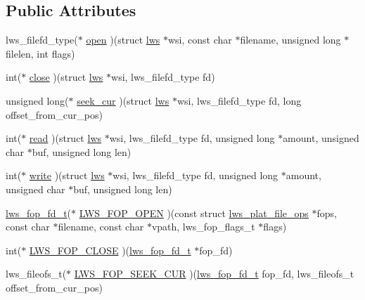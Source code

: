 \subsection*{Public Attributes}
\begin{DoxyCompactItemize}
\item 
lws\+\_\+filefd\+\_\+type($\ast$ \hyperlink{structlws__plat__file__ops_a795c1bff8c56f57e97b10fdb9e606947}{open} )(struct \hyperlink{structlws}{lws} $\ast$wsi, const char $\ast$filename, unsigned long $\ast$filelen, int flags)
\item 
int($\ast$ \hyperlink{structlws__plat__file__ops_ac6d1f0da750b68f23dd93a36aa32a3d7}{close} )(struct \hyperlink{structlws}{lws} $\ast$wsi, lws\+\_\+filefd\+\_\+type fd)
\item 
unsigned long($\ast$ \hyperlink{structlws__plat__file__ops_a4674d930d95dfaeb13793aba133ada07}{seek\+\_\+cur} )(struct \hyperlink{structlws}{lws} $\ast$wsi, lws\+\_\+filefd\+\_\+type fd, long offset\+\_\+from\+\_\+cur\+\_\+pos)
\item 
int($\ast$ \hyperlink{structlws__plat__file__ops_ae7d4c66f479bb978213197301878d335}{read} )(struct \hyperlink{structlws}{lws} $\ast$wsi, lws\+\_\+filefd\+\_\+type fd, unsigned long $\ast$amount, unsigned char $\ast$buf, unsigned long len)
\item 
int($\ast$ \hyperlink{structlws__plat__file__ops_a22186d061e99baee5a17fb41417a0e5e}{write} )(struct \hyperlink{structlws}{lws} $\ast$wsi, lws\+\_\+filefd\+\_\+type fd, unsigned long $\ast$amount, unsigned char $\ast$buf, unsigned long len)
\item 
\hyperlink{structlws__fop__fd}{lws\+\_\+fop\+\_\+fd\+\_\+t}($\ast$ \hyperlink{structlws__plat__file__ops_ae3f3bf075838ea3bbf90dba3a359f688}{L\+W\+S\+\_\+\+F\+O\+P\+\_\+\+O\+P\+EN} )(const struct \hyperlink{structlws__plat__file__ops}{lws\+\_\+plat\+\_\+file\+\_\+ops} $\ast$fops, const char $\ast$filename, const char $\ast$vpath, lws\+\_\+fop\+\_\+flags\+\_\+t $\ast$flags)
\item 
int($\ast$ \hyperlink{structlws__plat__file__ops_a39fdbb10ec92a4f5e4a66c9719c28d20}{L\+W\+S\+\_\+\+F\+O\+P\+\_\+\+C\+L\+O\+SE} )(\hyperlink{structlws__fop__fd}{lws\+\_\+fop\+\_\+fd\+\_\+t} $\ast$fop\+\_\+fd)
\item 
lws\+\_\+fileofs\+\_\+t($\ast$ \hyperlink{structlws__plat__file__ops_a9e073286e9b14b28cff6331abb56293c}{L\+W\+S\+\_\+\+F\+O\+P\+\_\+\+S\+E\+E\+K\+\_\+\+C\+UR} )(\hyperlink{structlws__fop__fd}{lws\+\_\+fop\+\_\+fd\+\_\+t} fop\+\_\+fd, lws\+\_\+fileofs\+\_\+t offset\+\_\+from\+\_\+cur\+\_\+pos)

\end{DoxyCompactItemize}
